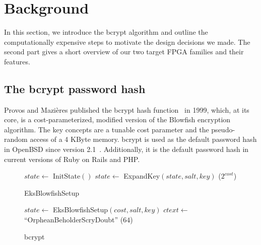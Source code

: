 
\section{Background}
\label{sec:background}

In this section, we introduce the bcrypt algorithm and outline the
computationally expensive steps to motivate the design decisions we made. The
second part gives a short overview of our two target FPGA families and their
features.

\subsection{The bcrypt password hash}
\label{sec:bcrypt}


Provos and Mazi\`{e}res published the bcrypt hash function~\cite{BCRYPT_paper}
in 1999, which, at its core, is a cost-parameterized, modified version of the
Blowfish encryption algorithm. The key concepts are a tunable cost parameter and
the pseudo-random access of a 4 KByte memory. bcrypt is used as the default
password hash in OpenBSD since version 2.1~\cite{BCRYPT_paper}. Additionally, it
is the default password hash in current versions of Ruby on Rails and PHP.

\begin{figure*}[tb] \centering
\removelatexerror
\begin{minipage}{.45\linewidth}
\begin{algorithm2e}[H]
	$state \leftarrow$ InitState$()$\;
	$state \leftarrow$ ExpandKey$(state, salt, key)$\;
	 ($2^{cost}$) 
	\;
	\caption{EksBlowfishSetup}
	\label{alg:eksblowfishsetup}
\end{algorithm2e}
\end{minipage}
	\hspace{0.5cm}
\begin{minipage}{.45\linewidth}
\begin{algorithm2e}[H]
	$state \leftarrow$ EksBlowfishSetup$(cost,salt,key)$\;
	$ctext \leftarrow$ ``OrpheanBeholderScryDoubt''\;
	 ($64$) 
	\;
	\caption{bcrypt}
	\label{alg:bcrypt}
\end{algorithm2e}
\end{minipage}
\end{figure*}

